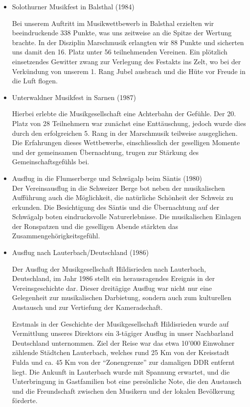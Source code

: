 \begin{history}
\begin{itemize}
        \item[]Solothurner Musikfest in Balsthal (1984)

        Bei unserem Auftritt im Musikwettbewerb in Balsthal erzielten wir
        beeindruckende 338 Punkte, was uns zeitweise an die Spitze der Wertung
        brachte. In der Disziplin Marschmusik erlangten wir 88 Punkte und
        sicherten uns damit den 16. Platz unter 56 teilnehmenden Vereinen. Ein
        plötzlich einsetzendes Gewitter zwang zur Verlegung des Festakts ins
        Zelt, wo bei der Verkündung von unserem 1. Rang Jubel ausbrach und die
        Hüte vor Freude in die Luft flogen.

        \item[]Unterwaldner Musikfest in Sarnen (1987)

        Hierbei erlebte die Musikgesellschaft eine Achterbahn der Gefühle. Der
        20. Platz von 28 Teilnehmern war zunächst eine Enttäuschung, jedoch
        wurde dies durch den erfolgreichen 5. Rang in der Marschmusik teilweise
        ausgeglichen. Die Erfahrungen dieses Wettbewerbs, einschliesslich der
        geselligen Momente und der gemeinsamen Übernachtung, trugen zur Stärkung
        des Gemeinschaftsgefühls bei.


        \item[]Ausflug in die Flumserberge und Schwägalp beim Säntis (1980)\\
        Der Vereinsausflug in die Schweizer Berge bot neben der musikalischen
        Aufführung auch die Möglichkeit, die natürliche Schönheit der Schweiz zu
        erkunden. Die Besichtigung des Säntis und die Übernachtung auf der
        Schwägalp boten eindrucksvolle Naturerlebnisse. Die musikalischen
        Einlagen der Ronspatzen und die geselligen Abende stärkten das
        Zusammengehörigkeitsgefühl.

        \item[]Ausflug nach Lauterbach/Deutschland (1986)

        Der Ausflug der Musikgesellschaft Hildisrieden nach Lauterbach,
        Deutschland, im Jahr 1986 stellt ein herausragendes Ereignis in der
        Vereinsgeschichte dar. Dieser dreitägige Ausflug war nicht nur eine
        Gelegenheit zur musikalischen Darbietung, sondern auch zum kulturellen
        Austausch und zur Vertiefung der Kameradschaft.

        Erstmals in der Geschichte der Musikgesellschaft Hildisrieden wurde auf
        Vermittlung unseres Direktors ein 3-tägiger Ausflug in unser Nachbarland
        Deutschland unternommen. Ziel der Reise war das etwa 10'000 Einwohner
        zählende Städtchen Lauterbach, welches rund 25 Km von der Kreisstadt
        Fulda und ca. 45 Km von der \enquote{Zonengrenze} zur damaligen DDR
        entfernt liegt. Die Ankunft in Lauterbach wurde mit Spannung erwartet,
        und die Unterbringung in Gastfamilien bot eine persönliche Note, die den
        Austausch und die Freundschaft zwischen den Musikern und der lokalen
        Bevölkerung förderte.


\end{itemize}
\end{history}
